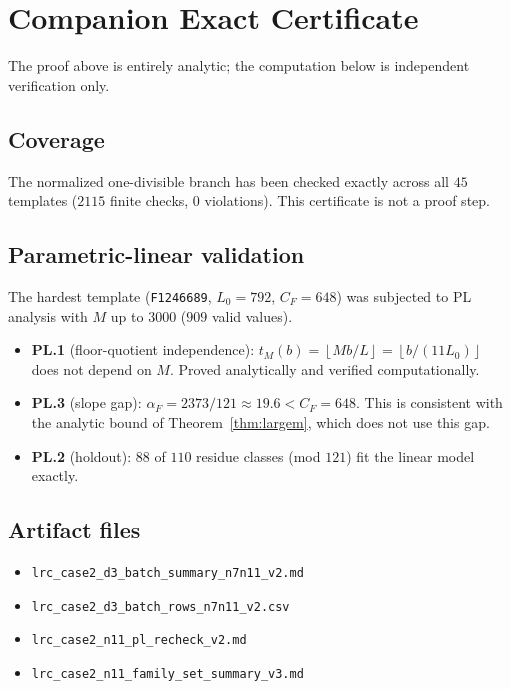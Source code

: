 \documentclass[11pt]{article}
\theoremstyle{definition}
\newcommand{\floor}[1]{\left\lfloor #1 \right\rfloor}
\begin{document}
\section{Companion Exact Certificate}
\label{sec:certificate}

The proof above is entirely analytic; the computation below is
independent verification only.

\subsection*{Coverage}

The normalized one-divisible branch has been checked exactly across all
$45$ templates ($2115$ finite checks, $0$ violations).
This certificate is not a proof step.

\subsection*{Parametric-linear validation}

The hardest template (\texttt{F1246689}, $L_0 = 792$, $C_F = 648$)
was subjected to PL analysis with $M$ up to $3000$ ($909$ valid values).
\begin{itemize}
  \item \textbf{PL.1} (floor-quotient independence):
    $t_M(b) = \floor{Mb/L} = \floor{b/(11L_0)}$ does not depend on $M$.
    Proved analytically and verified computationally.
  \item \textbf{PL.3} (slope gap):
    $\alpha_F = 2373/121 \approx 19.6 < C_F = 648$.
    This is consistent with the analytic bound of
    Theorem~\ref{thm:largem}, which does not use this gap.
  \item \textbf{PL.2} (holdout):
    $88$ of $110$ residue classes (mod $121$) fit the linear model
    exactly.
\end{itemize}

\subsection*{Artifact files}
\begin{itemize}
  \item \texttt{lrc\_case2\_d3\_batch\_summary\_n7n11\_v2.md}
  \item \texttt{lrc\_case2\_d3\_batch\_rows\_n7n11\_v2.csv}
  \item \texttt{lrc\_case2\_n11\_pl\_recheck\_v2.md}
  \item \texttt{lrc\_case2\_n11\_family\_set\_summary\_v3.md}
\end{itemize}
\end{document}
